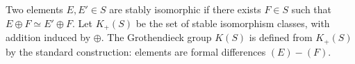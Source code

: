 Two elements $E, E' \in S$ are stably isomorphic if there exists $F \in S$ such that $E \oplus F \simeq E' \oplus F$. Let $K_+(S)$ be the set of stable isomorphism classes, with addition induced by $\oplus$. The Grothendieck group $K(S)$ is defined from $K_+(S)$ by the standard construction: elements are formal differences $(E) - (F)$.
